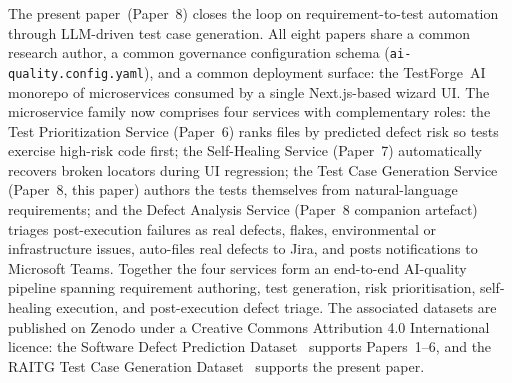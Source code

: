 \documentclass[11pt,letterpaper]{article}
\begin{document}
The present paper~(Paper~8) closes the loop on requirement-to-test automation through LLM-driven test case generation. All eight papers share a common research author, a common governance configuration schema (\texttt{ai-quality.config.yaml}), and a common deployment surface: the TestForge~AI monorepo of microservices consumed by a single Next.js-based wizard UI. The microservice family now comprises four services with complementary roles: the Test Prioritization Service (Paper~6) ranks files by predicted defect risk so tests exercise high-risk code first; the Self-Healing Service (Paper~7) automatically recovers broken locators during UI regression; the Test Case Generation Service (Paper~8, this paper) authors the tests themselves from natural-language requirements; and the Defect Analysis Service (Paper~8 companion artefact) triages post-execution failures as real defects, flakes, environmental or infrastructure issues, auto-files real defects to Jira, and posts notifications to Microsoft Teams. Together the four services form an end-to-end AI-quality pipeline spanning requirement authoring, test generation, risk prioritisation, self-healing execution, and post-execution defect triage. The associated datasets are published on Zenodo under a Creative Commons Attribution 4.0 International licence: the Software Defect Prediction Dataset~\cite{javvadi2025defect_dataset} supports Papers~1--6, and the RAITG Test Case Generation Dataset~\cite{javvadi2026raitg_dataset} supports the present paper.
\end{document}
